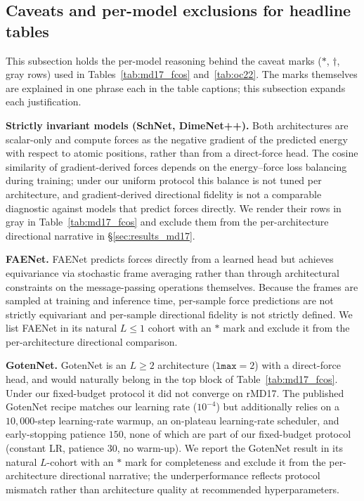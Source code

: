 
\subsection{Caveats and per-model exclusions for headline tables}\label{supp:results_caveats}

This subsection holds the per-model reasoning behind the caveat marks ($\ast$, $\dagger$, gray rows) used in Tables~\ref{tab:md17_fcos} and~\ref{tab:oc22}. The marks themselves are explained in one phrase each in the table captions; this subsection expands each justification.

\textbf{Strictly invariant models (SchNet, DimeNet++).} Both architectures are scalar-only and compute forces as the negative gradient of the predicted energy with respect to atomic positions, rather than from a direct-force head. The cosine similarity of gradient-derived forces depends on the energy--force loss balancing during training; under our uniform protocol this balance is not tuned per architecture, and gradient-derived directional fidelity is not a comparable diagnostic against models that predict forces directly. We render their rows in gray in Table~\ref{tab:md17_fcos} and exclude them from the per-architecture directional narrative in \S\ref{sec:results_md17}.

\textbf{FAENet.} FAENet predicts forces directly from a learned head but achieves equivariance via stochastic frame averaging rather than through architectural constraints on the message-passing operations themselves. Because the frames are sampled at training and inference time, per-sample force predictions are not strictly equivariant and per-sample directional fidelity is not strictly defined. We list FAENet in its natural $L\!\leq\!1$ cohort with an $\ast$ mark and exclude it from the per-architecture directional comparison.

\textbf{GotenNet.} GotenNet is an $L\!\geq\!2$ architecture ($\mathtt{lmax}{=}2$) with a direct-force head, and would naturally belong in the top block of Table~\ref{tab:md17_fcos}. Under our fixed-budget protocol it did not converge on rMD17. The published GotenNet recipe matches our learning rate ($10^{-4}$) but additionally relies on a $10{,}000$-step learning-rate warmup, an on-plateau learning-rate scheduler, and early-stopping patience $150$, none of which are part of our fixed-budget protocol (constant LR, patience $30$, no warm-up). We report the GotenNet result in its natural $L$-cohort with an $\ast$ mark for completeness and exclude it from the per-architecture directional narrative; the underperformance reflects protocol mismatch rather than architecture quality at recommended hyperparameters.

